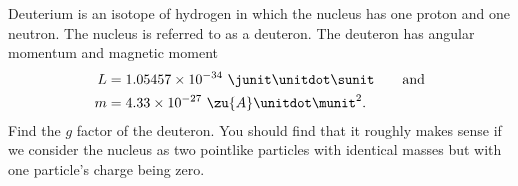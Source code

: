 Deuterium is an isotope of hydrogen in which the nucleus has one proton
and one neutron. The nucleus is referred to as a deuteron.
The deuteron has angular momentum and magnetic moment
\begin{align*}
  L &= 1.05457\times10^{-34}\ \junit\unitdot\sunit \qquad \text{and} \\
  m &= 4.33 \times10^{-27}\ \zu{A}\unitdot\munit^2.
\end{align*}
Find the $g$ factor of the deuteron. You should find that it roughly
makes sense if we consider the nucleus as two pointlike particles with
identical masses but with one particle's charge being zero.\answercheck

